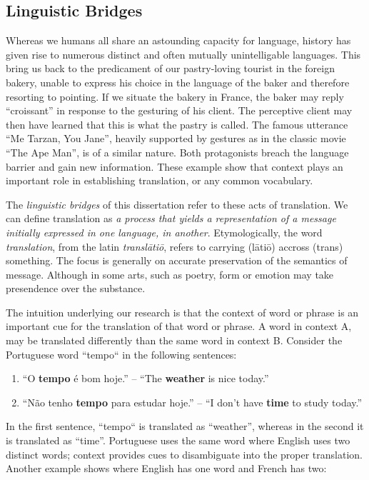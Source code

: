 \subsection{Linguistic Bridges}

Whereas we humans all share an astounding capacity for language, history has
given rise to numerous distinct and often mutually unintelligable languages.
This bring us back to the predicament of our pastry-loving tourist in the
foreign bakery, unable to express his choice in the language of the baker and
therefore resorting to pointing. If we situate the bakery in France, the baker
may reply ``croissant'' in response to the gesturing of his client. The
perceptive client may then have learned that this is what the pastry is called.
The famous utterance ``Me Tarzan, You Jane'', heavily supported by gestures as in
the classic movie ``The Ape Man'', is of a similar nature. Both protagonists
breach the language barrier and gain new information. These example show that context
plays an important role in establishing translation, or any common vocabulary. 

The \emph{linguistic bridges} of this dissertation refer to these acts of
translation. We can define translation as \emph{a process that yields a
representation of a message initially expressed in one language, in another}.
Etymologically, the word \emph{translation}, from the latin \emph{translātiō},
refers to carrying (lātiō) accross (trans) something. The focus is generally on
accurate preservation of the semantics of message.  Although in some arts, such
as poetry, form or emotion may take presendence over the substance.

The intuition underlying our research is that the context of word or phrase is
an important cue for the translation of that word or phrase. A word in context
A, may be translated differently than the same word in context B. Consider the
Portuguese word ``tempo`` in the following sentences:

\begin{enumerate}
\item ``O \textbf{tempo} é bom hoje.'' -- ``The \textbf{weather} is nice today.''
\item ``Não tenho \textbf{tempo} para estudar hoje.'' -- ``I don't have \textbf{time} to study today.''
\end{enumerate}

In the first sentence, ``tempo`` is translated as ``weather'', whereas in the
second it is translated as ``time''. Portuguese uses the same word where
English uses two distinct words; context provides cues to disambiguate into the
proper translation. Another example shows where English has one word and French has two:

